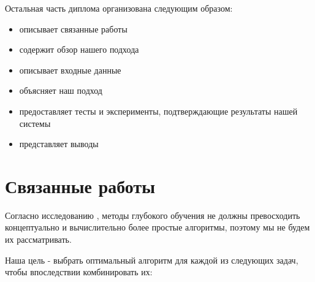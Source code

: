 \documentclass[14pt]{matmex-diploma-custom}
\begin{document}
    Остальная часть диплома организована следующим образом:
    
        \begin {itemize}
            \item {} описывает связанные работы
            \item {} содержит обзор нашего подхода
            \item {} описывает входные данные
            \item {} объясняет наш подход
            \item {} предоставляет тесты и эксперименты, подтверждающие
результаты нашей системы
            \item {} представляет выводы
        \end {itemize}




\section {Связанные работы}
\label {sec:related}

Согласно исследованию \citep {progress}, методы глубокого обучения не должны превосходить концептуально и вычислительно более простые алгоритмы, поэтому мы не будем их рассматривать.

Наша цель - выбрать оптимальный алгоритм для каждой из следующих задач, чтобы впоследствии комбинировать их:
\end{document}
